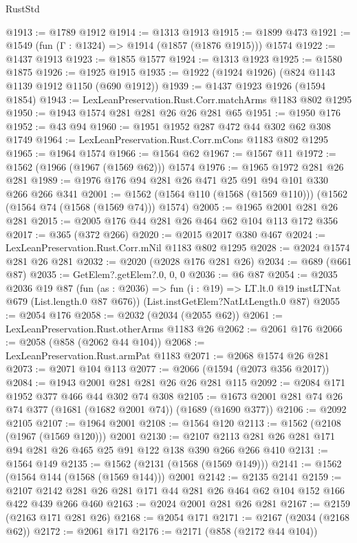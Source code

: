 \begin{lexlean}{RustStd}
\begin{coremodule}
@1913 := @1789 @1912
@1914 := @1313 @1913
@1915 := @1899 @473
@1921 := @1549 (fun (Γ : @1324) => @1914 (@1857 (@1876 @1915))) @1574
@1922 := @1437 @1913
@1923 := @1855 @1577
@1924 := @1313 @1923
@1925 := @1580 @1875
@1926 := @1925 @1915
@1935 := @1922 (@1924 @1926) (@824 @1143 @1139 @1912 @1150 (@690 @1912))
@1939 := @1437 @1923 @1926 (@1594 @1854)
@1943 := LexLeanPreservation.Rust.Corr.matchArms @1183 @802 @1295
@1950 := @1943 @1574 @281 @281 @26 @26 @281 @65
@1951 := @1950 @176
@1952 := @43 @94
@1960 := @1951 @1952 @287 @472 @44 @302 @62 @308 @1749
@1964 := LexLeanPreservation.Rust.Corr.mCons @1183 @802 @1295
@1965 := @1964 @1574
@1966 := @1564 @62
@1967 := @1567 @11
@1972 := @1562 (@1966 (@1967 (@1569 @62))) @1574
@1976 := @1965 @1972 @281 @26 @281
@1989 := @1976 @176 @94 @281 @26 @471 @25 @91 @94 @101 @330 @266 @266 @341
@2001 := @1562 (@1564 @110 (@1568 (@1569 @110))) (@1562 (@1564 @74 (@1568 (@1569 @74))) @1574)
@2005 := @1965 @2001 @281 @26 @281
@2015 := @2005 @176 @44 @281 @26 @464 @62 @104 @113 @172 @356
@2017 := @365 (@372 @266)
@2020 := @2015 @2017 @380 @467
@2024 := LexLeanPreservation.Rust.Corr.mNil @1183 @802 @1295
@2028 := @2024 @1574 @281 @26 @281
@2032 := @2020 (@2028 @176 @281 @26)
@2034 := @689 (@661 @87)
@2035 := GetElem?.getElem?.{0, 0, 0}
@2036 := @6 @87
@2054 := @2035
    @2036
    @19
    @87
    (fun (as : @2036) => fun (i : @19) => LT.lt.{0} @19 instLTNat @679 (List.length.{0} @87 @676))
    (List.instGetElem?NatLtLength.{0} @87)
@2055 := @2054 @176
@2058 := @2032 (@2034 (@2055 @62))
@2061 := LexLeanPreservation.Rust.otherArms @1183 @26
@2062 := @2061 @176
@2066 := @2058 (@858 (@2062 @44 @104))
@2068 := LexLeanPreservation.Rust.armPat @1183
@2071 := @2068 @1574 @26 @281
@2073 := @2071 @104 @113
@2077 := @2066 (@1594 (@2073 @356 @2017))
@2084 := @1943 @2001 @281 @281 @26 @26 @281 @115
@2092 := @2084 @171 @1952 @377 @466 @44 @302 @74 @308
@2105 := @1673 @2001 @281 @74 @26 @74 @377 (@1681 (@1682 @2001 @74)) (@1689 (@1690 @377))
@2106 := @2092 @2105
@2107 := @1964 @2001
@2108 := @1564 @120
@2113 := @1562 (@2108 (@1967 (@1569 @120))) @2001
@2130 := @2107 @2113 @281 @26 @281 @171 @94 @281 @26 @465 @25 @91 @122 @138 @390 @266 @266 @410
@2131 := @1564 @149
@2135 := @1562 (@2131 (@1568 (@1569 @149)))
@2141 := @1562 (@1564 @144 (@1568 (@1569 @144))) @2001
@2142 := @2135 @2141
@2159 := @2107 @2142 @281 @26 @281 @171 @44 @281 @26 @464 @62 @104 @152 @166 @422 @439 @266 @460
@2163 := @2024 @2001 @281 @26 @281
@2167 := @2159 (@2163 @171 @281 @26)
@2168 := @2054 @171
@2171 := @2167 (@2034 (@2168 @62))
@2172 := @2061 @171
@2176 := @2171 (@858 (@2172 @44 @104))

\end{coremodule}
\end{lexlean}

